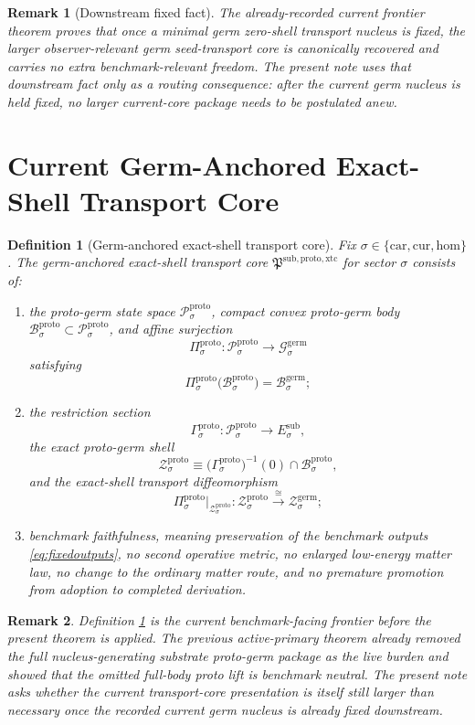\documentclass[11pt]{article}
\newcommand{\Car}{\mathrm{car}}
\newcommand{\Cur}{\mathrm{cur}}
\newcommand{\Hom}{\mathrm{hom}}
\newcommand{\SubTarget}[1]{E_{#1}^{\mathrm{sub}}}
\newcommand{\GermState}[1]{\mathcal G_{#1}^{\mathrm{germ}}}
\newcommand{\GermBody}[1]{\mathcal B_{#1}^{\mathrm{germ}}}
\newcommand{\GermShell}[1]{\mathcal Z_{#1}^{\mathrm{germ}}}
\newcommand{\ProtoTransportCore}{\mathfrak P^{\mathrm{sub,proto,xtc}}}
\newcommand{\ProtoState}[1]{\mathcal P_{#1}^{\mathrm{proto}}}
\newcommand{\ProtoBody}[1]{\mathcal B_{#1}^{\mathrm{proto}}}
\newcommand{\ProtoProj}[1]{\Pi_{#1}^{\mathrm{proto}}}
\newcommand{\ProtoSection}[1]{\Gamma_{#1}^{\mathrm{proto}}}
\newcommand{\ProtoShell}[1]{\mathcal Z_{#1}^{\mathrm{proto}}}
\newtheorem{definition}{Definition}
\newtheorem{remark}{Remark}
\begin{document}
\begin{remark}[Downstream fixed fact]
\label{rem:downstream}
The already-recorded current frontier theorem proves that once a minimal germ zero-shell transport nucleus is fixed, the larger observer-relevant germ seed-transport core is canonically recovered and carries no extra benchmark-relevant freedom. The present note uses that downstream fact only as a routing consequence: after the current germ nucleus is held fixed, no larger current-core package needs to be postulated anew.
\end{remark}

\section{Current Germ-Anchored Exact-Shell Transport Core}

\begin{definition}[Germ-anchored exact-shell transport core]
\label{def:core}
Fix \(\sigma\in\{\Car,\Cur,\Hom\}\). The \emph{germ-anchored exact-shell transport core} \(\ProtoTransportCore\) for sector \(\sigma\) consists of:
\begin{enumerate}
    \item the proto-germ state space \(\ProtoState{\sigma}\), compact convex proto-germ body \(\ProtoBody{\sigma}\subset\ProtoState{\sigma}\), and affine surjection
    \[
    \ProtoProj{\sigma}:\ProtoState{\sigma}\to\GermState{\sigma}
    \]
    satisfying
    \[
    \ProtoProj{\sigma}\bigl(\ProtoBody{\sigma}\bigr)=\GermBody{\sigma};
    \]
    \item the restriction section
    \[
    \ProtoSection{\sigma}:\ProtoState{\sigma}\to\SubTarget{\sigma},
    \]
    the exact proto-germ shell
    \[
    \ProtoShell{\sigma}
    \equiv
    \bigl(\ProtoSection{\sigma}\bigr)^{-1}(0)\cap\ProtoBody{\sigma},
    \]
    and the exact-shell transport diffeomorphism
    \[
    \ProtoProj{\sigma}\big|_{\ProtoShell{\sigma}}
    :
    \ProtoShell{\sigma}
    \xrightarrow{\cong}
    \GermShell{\sigma};
    \]
    \item benchmark faithfulness, meaning preservation of the benchmark outputs \eqref{eq:fixedoutputs}, no second operative metric, no enlarged low-energy matter law, no change to the ordinary matter route, and no premature promotion from adoption to completed derivation.
\end{enumerate}
\end{definition}

\begin{remark}
Definition \ref{def:core} is the current benchmark-facing frontier before the present theorem is applied. The previous active-primary theorem already removed the full nucleus-generating substrate proto-germ package as the live burden and showed that the omitted full-body proto lift is benchmark neutral. The present note asks whether the current transport-core presentation is itself still larger than necessary once the recorded current germ nucleus is already fixed downstream.
\end{remark}
\end{document}
